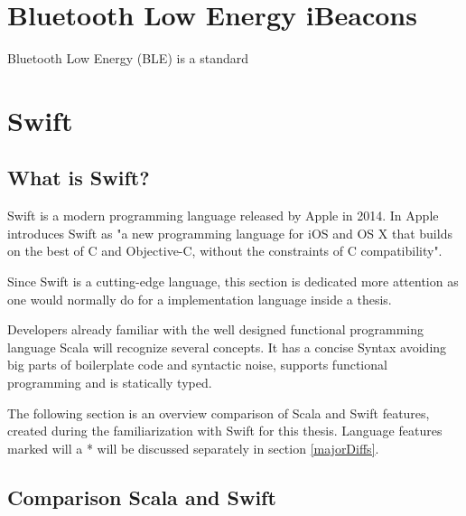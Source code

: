 \section{Bluetooth Low Energy iBeacons}

Bluetooth Low Energy (BLE) is a standard %

\section{Swift}

\subsection{What is Swift?}

Swift is a modern programming language released by Apple in 2014. In \cite{swift-book} Apple introduces Swift as "a new programming language for iOS and OS X that builds on the best of C and Objective-C, without the constraints of C compatibility".

Since Swift is a cutting-edge language, this section is dedicated more attention as one would normally do for a implementation language inside a thesis. 

Developers already familiar with the well designed functional programming language Scala will recognize several concepts. It has a concise Syntax avoiding big parts of boilerplate code and syntactic noise, supports functional programming and is statically typed.

The following section is an overview comparison of Scala and Swift features, created during the familiarization with Swift for this thesis. Language features marked will a * will be discussed separately in section \ref{majorDiffs}.

\subsection{Comparison Scala and Swift}

\newcommand{\yes}{yes}

